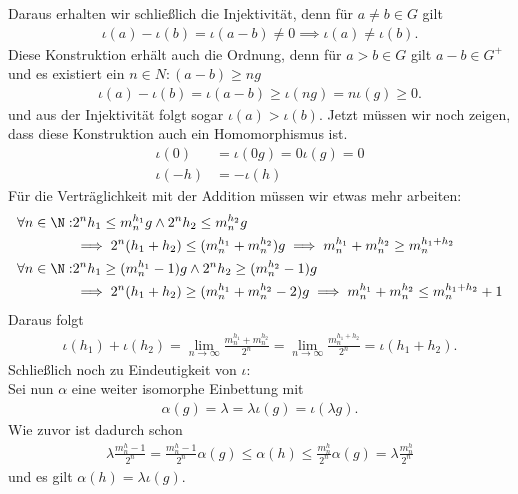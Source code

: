 \begin{solution}
Daraus erhalten wir schließlich die Injektivität, denn für $a \neq b \in G$ gilt
\begin{align*}
  \iota(a) - \iota(b) = \iota(a-b) \neq 0 \implies \iota(a) \neq \iota(b).
\end{align*}
Diese Konstruktion erhält auch die Ordnung, denn für $a > b \in G$ gilt $a-b \in G^+$
und es existiert ein $n \in N: (a-b) \geq ng$
\begin{align*}
  \iota(a) - \iota(b) = \iota(a-b) \geq \iota(ng) = n\iota(g) \geq 0.
\end{align*}
und aus der Injektivität folgt sogar $\iota(a) > \iota(b)$.
Jetzt müssen wir noch zeigen, dass diese Konstruktion auch ein Homomorphismus ist.
\begin{align*}
  \iota(0) &= \iota(0g) = 0\iota(g) = 0 \\
  \iota(-h) &= -\iota(h)
\end{align*}
Für die Verträglichkeit mit der Addition müssen wir etwas mehr arbeiten:
\begin{align*}
  \forall n \in \N:& 2^nh_1 \leq m_n^{h_1}g \land 2^nh_2 \leq m_n^{h_2}g \\
  &\implies 2^n(h_1 + h_2) \leq (m_n^{h_1} + m_n^{h_2})g \implies m_n^{h_1} + m_n^{h_2} \geq m_n^{h_1 + h_2} \\
  \forall n \in \N:& 2^nh_1 \geq (m_n^{h_1}-1)g \land 2^nh_2 \geq (m_n^{h_2}-1)g \\
  &\implies 2^n(h_1 + h_2) \geq (m_n^{h_1} + m_n^{h_2} - 2)g \implies m_n^{h_1} + m_n^{h_2} \leq m_n^{h_1 + h_2} + 1
\end{align*}
Daraus folgt
\begin{align*}
  \iota(h_1) + \iota(h_2) = \lim_{n \rightarrow \infty} \frac{m_n^{h_1} + m_n^{h_2}}{2^n}
  = \lim_{n \rightarrow \infty} \frac{m_n^{h_1 + h_2}}{2^n} = \iota(h_1 + h_2).
\end{align*}
Schließlich noch zu Eindeutigkeit von $\iota$: \\
Sei nun $\alpha$ eine weiter isomorphe Einbettung mit
\begin{align*}
  \alpha(g) = \lambda = \lambda \iota(g) = \iota(\lambda g).
\end{align*}
Wie zuvor ist dadurch schon
\begin{align*}
  \lambda \frac{m_n^h - 1}{2^n} = \frac{m_n^h - 1}{2^n}\alpha(g) \leq \alpha(h) \leq \frac{m_n^h}{2^n}\alpha(g)
  = \lambda \frac{m_n^h}{2^n}
\end{align*}
und es gilt $\alpha(h) = \lambda \iota(g)$.
\end{solution}
